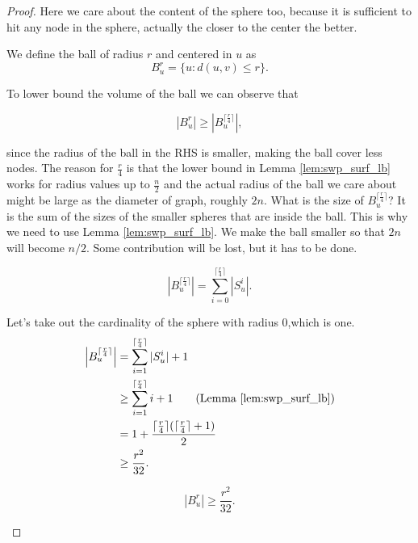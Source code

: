 \begin{proof}
Here we care about the content of the sphere too, because it is sufficient to hit any node in the sphere, actually the closer to the center the better.

\begin{defn} We define the ball of radius $r$ and centered in $u$ as
	\begin{equation}
	B_u^r = \{ u : d(u, v) \leq r \}.
	\end{equation}
\end{defn}

To lower bound the volume of the ball we can observe that

\begin{equation}
|B_u^r| \geq \left|B_u^{\lceil \frac{r}{4}\rceil}\right|,
\end{equation}

since the radius of the ball in the RHS is smaller, making the ball cover less nodes. The reason for $\frac{r}{4}$ is that the lower bound in Lemma \ref{lem:swp_surf_lb} works for radius values up to $\frac{n}{2}$ and the actual radius of the ball we care about might be large as the diameter of graph, roughly $2n$. What is the size of $B_u^{\lceil \frac{r}{4}\rceil}$? It is the sum of the sizes of the smaller spheres that are inside the ball. This is why we need to use Lemma \ref{lem:swp_surf_lb}. We make the ball smaller so that $2n$ will become $n/2$. Some contribution will be lost, but it has to be done.

\begin{equation}
\left|B_u^{\lceil \frac{r}{4}\rceil}\right| = \sum_{i = 0}^{\lceil \frac{r}{4}\rceil}|S_u^i|.
\end{equation}

Let's take out the cardinality of the sphere with radius 0,which is one.
\begin{align}
\left|B_u^{\lceil \frac{r}{4}\rceil}\right|&=\sum_{i = 1}^{\lceil \frac{r}{4}\rceil}|S_u^i| + 1\\
&\geq \sum_{i = 1}^{\lceil \frac{r}{4}\rceil}i + 1 \tag{Lemma \ref{lem:swp_surf_lb}}\\
&=1 + \frac{\lceil \frac{r}{4}\rceil(\lceil \frac{r}{4}\rceil + 1)}{2}\\
&\geq \frac{r^2}{32}.
\end{align}

\begin{lem}
	\begin{equation}
		\left|B_u^r\right| \geq \frac{r^2}{32}.
	\end{equation}
\end{lem}


\end{proof}
